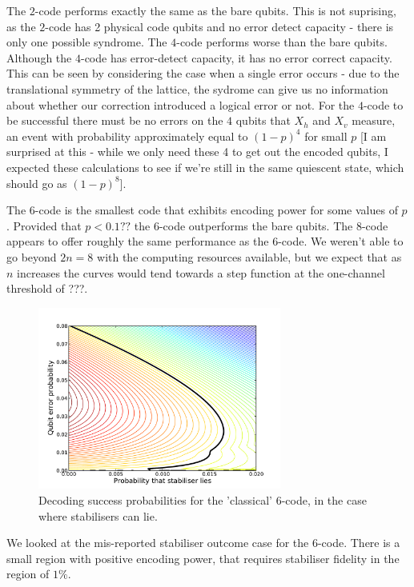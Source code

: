 The $2$-code performs exactly the same as the bare qubits. This is not suprising, as the $2$-code has 2 physical code qubits and no error detect capacity - there is only one possible syndrome. The $4$-code performs worse than the bare qubits. Although the $4$-code has error-detect capacity, it has no error correct capacity. This can be seen by considering the case when a single error occurs - due to the translational symmetry of the lattice, the sydrome can give us no information about whether our correction introduced a logical error or not. For the $4$-code to be successful there must be no errors on the $4$ qubits that $X_h$ and $X_v$ measure, an event with probability approximately equal to $(1-p)^4$ for small $p$ [I am surprised at this - while we only need these 4 to get out the encoded qubits, I expected these calculations to see if we're still in the same quiescent state, which should go as $(1-p)^8$].

The $6$-code is the smallest code that exhibits encoding power for some values of $p$. Provided that $p < 0.1??$ the $6$-code outperforms the bare qubits. The $8$-code appears to offer roughly the same performance as the $6$-code. We weren't able to go beyond $2n=8$ with the computing resources available, but we expect that as $n$ increases the curves would tend towards a step function at the one-channel threshold of ???.

\begin{figure}[htb]
  \begin{center}
    \includegraphics[width=8cm]{assets/x_lying.pdf}
  \end{center}
  \caption{Decoding success probabilities for the 'classical' $6$-code, in the case where stabilisers can lie.}
  \label{x_lying}
\end{figure}

We looked at the mis-reported stabiliser outcome case for the $6$-code. There is a small region with positive encoding power, that requires stabiliser fidelity in the region of $1\%$.

